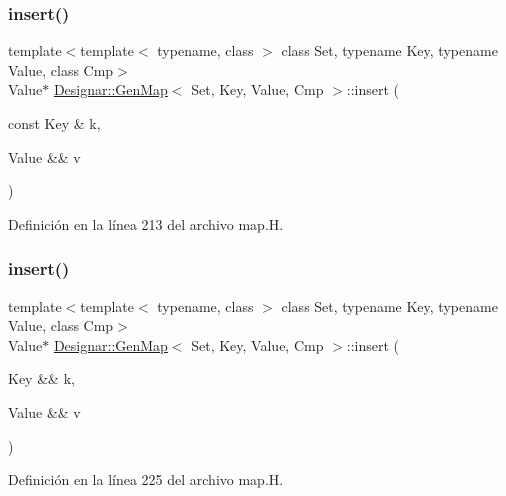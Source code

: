\subsubsection{\texorpdfstring{insert()}{insert()}\hspace{0.1cm}{\footnotesize\ttfamily [3/4]}}
{\footnotesize\ttfamily template$<$template$<$ typename, class $>$ class Set, typename Key, typename Value, class Cmp$>$ \\
Value$\ast$ \hyperlink{class_designar_1_1_gen_map}{Designar\+::\+Gen\+Map}$<$ Set, Key, Value, Cmp $>$\+::insert (\begin{DoxyParamCaption}\item[{const Key \&}]{k,  }\item[{Value \&\&}]{v }\end{DoxyParamCaption})\hspace{0.3cm}{\ttfamily [inline]}}



Definición en la línea 213 del archivo map.\+H.

\mbox{\label{class_designar_1_1_gen_map_a514311c4192292ff816931e0c42f929f}} 
\subsubsection{\texorpdfstring{insert()}{insert()}\hspace{0.1cm}{\footnotesize\ttfamily [4/4]}}
{\footnotesize\ttfamily template$<$template$<$ typename, class $>$ class Set, typename Key, typename Value, class Cmp$>$ \\
Value$\ast$ \hyperlink{class_designar_1_1_gen_map}{Designar\+::\+Gen\+Map}$<$ Set, Key, Value, Cmp $>$\+::insert (\begin{DoxyParamCaption}\item[{Key \&\&}]{k,  }\item[{Value \&\&}]{v }\end{DoxyParamCaption})\hspace{0.3cm}{\ttfamily [inline]}}



Definición en la línea 225 del archivo map.\+H.

\mbox{\label{class_designar_1_1_gen_map_a994a7afc52e7421661f2eed7c03e6ae7}} 
